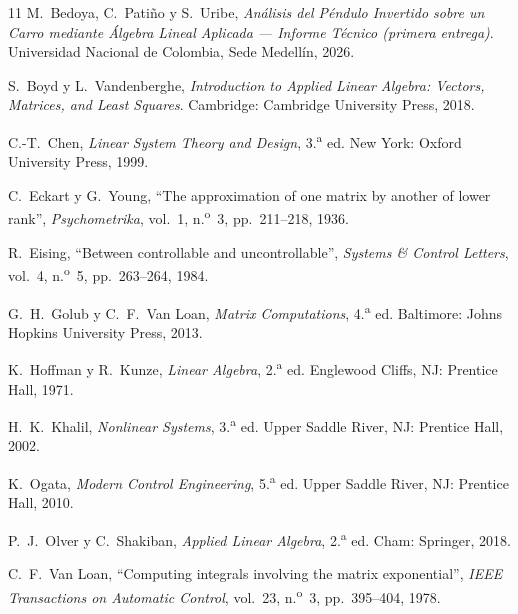 \documentclass[11pt,letterpaper]{article}
\theoremstyle{definition}
\theoremstyle{plain}
\theoremstyle{remark}
\begin{document}
\begin{thebibliography}{11}
\small
{}
M.~Bedoya, C.~Patiño y S.~Uribe, \emph{Análisis del Péndulo Invertido sobre un
Carro mediante Álgebra Lineal Aplicada --- Informe Técnico (primera entrega)}.
Universidad Nacional de Colombia, Sede Medellín, 2026.

S.~Boyd y L.~Vandenberghe, \emph{Introduction to Applied Linear Algebra:
Vectors, Matrices, and Least Squares}. Cambridge: Cambridge University Press,
2018.

C.-T.~Chen, \emph{Linear System Theory and Design}, 3.\textsuperscript{a} ed.
New York: Oxford University Press, 1999.

C.~Eckart y G.~Young, ``The approximation of one matrix by another of lower
rank'', \emph{Psychometrika}, vol.~1, n.\textsuperscript{o}~3, pp.~211--218, 1936.

R.~Eising, ``Between controllable and uncontrollable'', \emph{Systems \& Control
Letters}, vol.~4, n.\textsuperscript{o}~5, pp.~263--264, 1984.

G.~H.~Golub y C.~F.~Van Loan, \emph{Matrix Computations},
4.\textsuperscript{a} ed. Baltimore: Johns Hopkins University Press, 2013.

K.~Hoffman y R.~Kunze, \emph{Linear Algebra}, 2.\textsuperscript{a} ed.
Englewood Cliffs, NJ: Prentice Hall, 1971.

H.~K.~Khalil, \emph{Nonlinear Systems}, 3.\textsuperscript{a} ed.
Upper Saddle River, NJ: Prentice Hall, 2002.

K.~Ogata, \emph{Modern Control Engineering}, 5.\textsuperscript{a} ed.
Upper Saddle River, NJ: Prentice Hall, 2010.

P.~J.~Olver y C.~Shakiban, \emph{Applied Linear Algebra},
2.\textsuperscript{a} ed. Cham: Springer, 2018.

C.~F.~Van Loan, ``Computing integrals involving the matrix exponential'',
\emph{IEEE Transactions on Automatic Control}, vol.~23,
n.\textsuperscript{o}~3, pp.~395--404, 1978.

\end{thebibliography}
\end{document}
